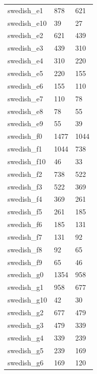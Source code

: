 {\begin{supertabular}{|lll|}
                swedish\_e1 &    878 &    621 \\
               swedish\_e10 &     39 &     27 \\
                swedish\_e2 &    621 &    439 \\
                swedish\_e3 &    439 &    310 \\
                swedish\_e4 &    310 &    220 \\
                swedish\_e5 &    220 &    155 \\
                swedish\_e6 &    155 &    110 \\
                swedish\_e7 &    110 &     78 \\
                swedish\_e8 &     78 &     55 \\
                swedish\_e9 &     55 &     39 \\
                swedish\_f0 &   1477 &   1044 \\
                swedish\_f1 &   1044 &    738 \\
               swedish\_f10 &     46 &     33 \\
                swedish\_f2 &    738 &    522 \\
                swedish\_f3 &    522 &    369 \\ \shrinkheight{5mm}
                swedish\_f4 &    369 &    261 \\
                swedish\_f5 &    261 &    185 \\
                swedish\_f6 &    185 &    131 \\
                swedish\_f7 &    131 &     92 \\
                swedish\_f8 &     92 &     65 \\
                swedish\_f9 &     65 &     46 \\
                swedish\_g0 &   1354 &    958 \\
                swedish\_g1 &    958 &    677 \\
               swedish\_g10 &     42 &     30 \\
                swedish\_g2 &    677 &    479 \\
                swedish\_g3 &    479 &    339 \\
                swedish\_g4 &    339 &    239 \\
                swedish\_g5 &    239 &    169 \\
                swedish\_g6 &    169 &    120 \\

\end{supertabular}}
